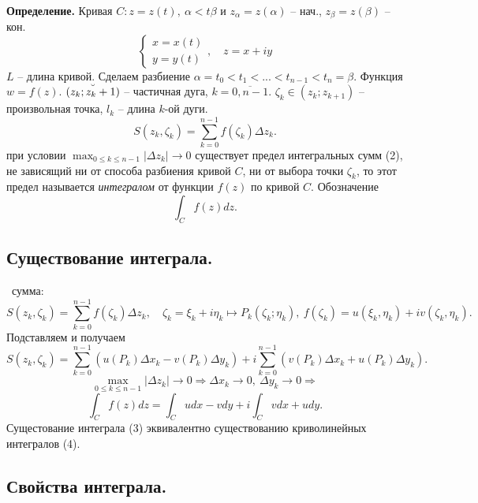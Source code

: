 \documentclass[9pt]{article}
\begin{document}
\ 
\par\textbf{Определение.} Кривая \(C:z=z(t),\ \alpha<t\beta\) и \(z_\alpha=z(\alpha)\) -- нач., \(z_\beta=z(\beta)\) -- кон.
\begin{equation}
    \left\{\begin{array}{l}
    x=x(t) \\
    y=y(t)
\end{array}\right.,\quad z=x+iy
\end{equation}
\(L\) -- длина кривой. Сделаем разбиение \(\alpha=t_0<t_1<...<t_{n-1}<t_n=\beta\). Функция \(w=f(z)\). \(\Breve{(z_k;z_k+1)}\) -- частичная дуга, \(k=\overline{0,n-1}\). \(\zeta_k\in(z_k;z_{k+1})\) -- произвольная точка, \(l_k\) -- длина \(k\)-ой дуги.
\begin{equation}
    S(z_k,\zeta_k)=\displaystyle\sum_{k=0}^{n-1}f(\zeta_k)\Delta z_k.
\end{equation}
 при условии \(\displaystyle\max_{0\le k\le n-1}|\Delta z_k|\to0\) существует предел интегральных сумм (2), не зависящий ни от способа разбиения кривой \(C\), ни от выбора точки \(\zeta_k\), то этот предел называется \textit{интегралом} от функции \(f(z)\) по кривой \(C\). Обозначение
\begin{equation}
    \int_Cf(z)dz.
\end{equation}

\subsection{Существование интеграла.}

\ 
 сумма:
\[S(z_k,\zeta_k)=\displaystyle\sum_{k=0}^{n-1}f(\zeta_k)\Delta z_k,\quad\zeta_k=\xi_k+i\eta_k\mapsto P_k(\zeta_k;\eta_k),\ f(\zeta_k)=u(\xi_k,\eta_k)+iv(\zeta_k,\eta_k).\]
Подставляем и получаем
\[S(z_k,\zeta_k)=\displaystyle\sum_{k=0}^{n-1}(u(P_k)\Delta x_k-v(P_k)\Delta y_k)+i\sum_{k=0}^{n-1}(v(P_k)\Delta x_k+u(P_k)\Delta y_k).\]
\[\displaystyle\max_{0\le k\le n-1}|\Delta z_k|\to0\Rightarrow \Delta x_k\to0,\ \Delta y_k\to0\Rightarrow\]
\begin{equation}\tag{4}
    \int_Cf(z)dz=\int_Cudx-vdy+i\int_Cvdx+udy.
\end{equation}
Сущестование интеграла (3) эквивалентно существованию криволинейных интегралов (4).

\subsection{Свойства интеграла.}
\end{document}
